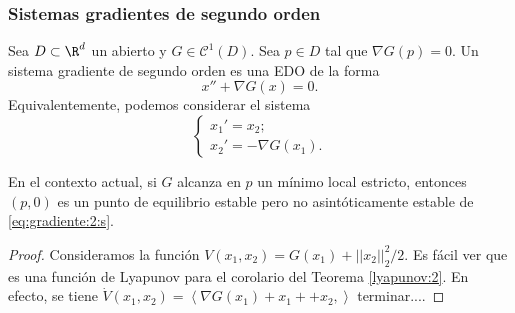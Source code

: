 \subsubsection{Sistemas gradientes de segundo orden}

Sea $D \subset \R^d$ un abierto y $G \in \mathcal{C}^1(D)$. Sea $p \in D$ tal que $\nabla G(p) =
0$. Un sistema gradiente de segundo orden es una EDO de la forma
\begin{equation}
  \label{eq:gradiente:2}
  x'' + \nabla G(x) = 0.
  \tag{G2}
\end{equation}
Equivalentemente, podemos considerar el sistema
\begin{equation}
  \label{eq:gradiente:2:s}
  \begin{cases}
    x_1' = x_2; \\
    x_2' = - \nabla G(x_1).
  \end{cases}
  \tag{G2S}
\end{equation}

\begin{theorem}
  \label{thm:lagrange-dirichlet}
  En el contexto actual, si $G$ alcanza en $p$ un mínimo local estricto, entonces $(p,0)$ es un
  punto de equilibrio estable pero no asintóticamente estable de \eqref{eq:gradiente:2:s}.
\end{theorem}
\begin{proof}
  Consideramos la función $V(x_1, x_2) = G(x_1) + ||x_2||_2^2 / 2$. Es fácil ver que es una función
  de Lyapunov para el corolario del Teorema \ref{lyapunov:2}. En efecto, se tiene
  $\dot{V}(x_1, x_2) = \left\langle \nabla G(x_1) + x_1+ + x_2, \right\rangle$ terminar....
\end{proof}


